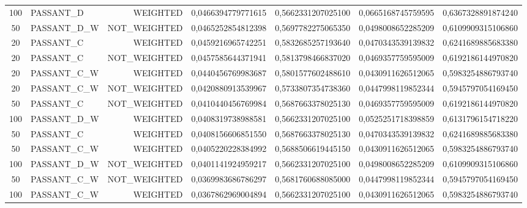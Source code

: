 \begin{table}[H]
{\begin{tabular}{ c l r c c c c }
	100 &  PASSANT\_D &   WEIGHTED & 0,0466394779771615 & 0,5662331207025100 & 0,0665168745759595 & 0,6367328891874240 \\
	
	50 & PASSANT\_D\_W & NOT\_WEIGHTED & 0,0465252854812398 & 0,5697782275065350 & 0,0498008652285209 & 0,6109909315106860 \\
	
	20 &  PASSANT\_C &   WEIGHTED & 0,0459216965742251 & 0,5832685257193640 & 0,0470343539139832 & 0,6241689885683380 \\
	
	20 &  PASSANT\_C & NOT\_WEIGHTED & 0,0457585644371941 & 0,5813798466837020 & 0,0469357759595009 & 0,6192186144970820 \\
	
	20 & PASSANT\_C\_W &   WEIGHTED & 0,0440456769983687 & 0,5801577602488610 & 0,0430911626512065 & 0,5983254886793740 \\
	
	20 & PASSANT\_C\_W & NOT\_WEIGHTED & 0,0420880913539967 & 0,5733807354738360 & 0,0447998119852344 & 0,5945797054169450 \\
	
	50 &  PASSANT\_C & NOT\_WEIGHTED & 0,0410440456769984 & 0,5687663378025130 & 0,0469357759595009 & 0,6192186144970820 \\
	
	100 & PASSANT\_D\_W &   WEIGHTED & 0,0408319738988581 & 0,5662331207025100 & 0,0525251718398859 & 0,6131796154718220 \\
	
	50 &  PASSANT\_C &   WEIGHTED & 0,0408156606851550 & 0,5687663378025130 & 0,0470343539139832 & 0,6241689885683380 \\
	
	50 & PASSANT\_C\_W &   WEIGHTED & 0,0405220228384992 & 0,5688506619445150 & 0,0430911626512065 & 0,5983254886793740 \\
	
	100 & PASSANT\_D\_W & NOT\_WEIGHTED & 0,0401141924959217 & 0,5662331207025100 & 0,0498008652285209 & 0,6109909315106860 \\
	
	50 & PASSANT\_C\_W & NOT\_WEIGHTED & 0,0369983686786297 & 0,5681760688085000 & 0,0447998119852344 & 0,5945797054169450 \\
	
	100 & PASSANT\_C\_W &   WEIGHTED & 0,0367862969004894 & 0,5662331207025100 & 0,0430911626512065 & 0,5983254886793740 \\
	

\end{tabular}}
\end{table}
